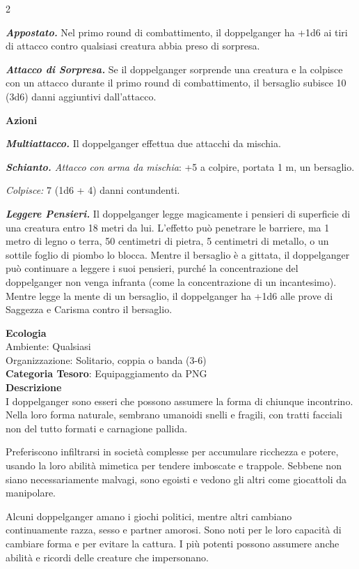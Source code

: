 \begin{multicols}{2}
{\emph{\textbf{Appostato.}} Nel primo round di combattimento, il doppelganger ha +1d6 ai tiri di attacco contro qualsiasi creatura abbia preso di sorpresa.

\emph{\textbf{Attacco di Sorpresa.}} Se il doppelganger sorprende una creatura e la colpisce con un attacco durante il primo round di combattimento, il bersaglio subisce 10 (3d6) danni aggiuntivi dall'attacco.

\textbf{Azioni}

\emph{\textbf{Multiattacco.}} Il doppelganger effettua due attacchi da mischia.

\emph{\textbf{Schianto.} Attacco con arma da mischia}: +5 a colpire, portata 1 m, un bersaglio.

\emph{Colpisce:} 7 (1d6 + 4) danni contundenti.

\emph{\textbf{Leggere Pensieri.}} Il doppelganger legge magicamente i pensieri di superficie di una creatura entro 18 metri da lui. L'effetto può penetrare le barriere, ma 1 metro di legno o terra, 50 centimetri di pietra, 5 centimetri di metallo, o un sottile foglio di piombo lo blocca. Mentre il bersaglio è a gittata, il doppelganger può continuare a leggere i suoi pensieri, purché la concentrazione del doppelganger non venga infranta (come la concentrazione di un incantesimo). Mentre legge la mente di un bersaglio, il doppelganger ha +1d6 alle prove di Saggezza e Carisma contro il bersaglio.

\textbf{Ecologia}\\
Ambiente: Qualsiasi\\
Organizzazione: Solitario, coppia o banda (3-6)\\
\textbf{Categoria Tesoro}: Equipaggiamento da PNG\\
\textbf{Descrizione}\\
I doppelganger sono esseri che possono assumere la forma di chiunque incontrino. Nella loro forma naturale, sembrano umanoidi snelli e fragili, con tratti facciali non del tutto formati e carnagione pallida.

Preferiscono infiltrarsi in società complesse per accumulare ricchezza e potere, usando la loro abilità mimetica per tendere imboscate e trappole. Sebbene non siano necessariamente malvagi, sono egoisti e vedono gli altri come giocattoli da manipolare.

Alcuni doppelganger amano i giochi politici, mentre altri cambiano continuamente razza, sesso e partner amorosi. Sono noti per le loro capacità di cambiare forma e per evitare la cattura. I più potenti possono assumere anche abilità e ricordi delle creature che impersonano.

}
\end{multicols}
